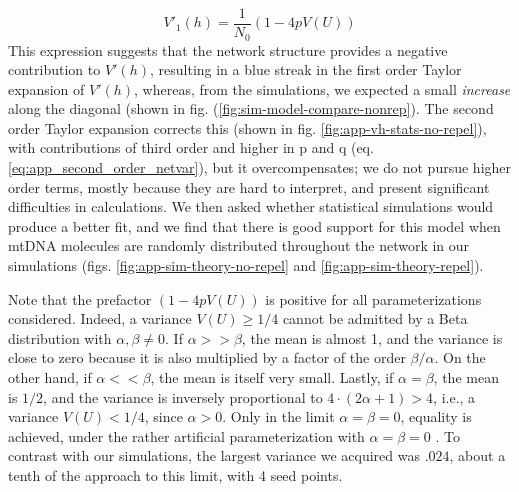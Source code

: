 \documentclass{article}
\begin{document}
\begin{appendices}
\begin{equation}\label{eq:vh-no-repel-delta}
    V'_1(h) = \frac{1}{N_0}(1-4pV(U))
\end{equation}
This expression suggests that the network structure provides a negative contribution to $V'(h)$, resulting in a blue streak in the first order Taylor expansion of $V'(h)$, whereas, from the simulations, we expected a small \textit{increase} along the diagonal (shown in fig. (\ref{fig:sim-model-compare-nonrep}). The second order Taylor expansion corrects this (shown in fig. \ref{fig:app-vh-stats-no-repel}), with contributions of third order and higher in p and q (eq. \ref{eq:app_second_order_netvar}), but it overcompensates; we do not pursue higher order terms, mostly because they are hard to interpret, and present significant difficulties in calculations. We then asked whether statistical simulations would produce a better fit, and we find that there is good support for this model when mtDNA molecules are randomly distributed throughout the network in our simulations (figs. \ref{fig:app-sim-theory-no-repel} and \ref{fig:app-sim-theory-repel}).

Note that the prefactor $(1-4pV(U))$ is positive for all parameterizations considered. Indeed, a variance $V(U)\geq1/4$ cannot be admitted by a Beta distribution with $\alpha,\beta\neq 0$. If $\alpha>>\beta$, the mean is almost 1, and the variance is close to zero because it is also multiplied by a factor of the order $\beta/\alpha$. On the other hand, if $\alpha<<\beta$, the mean is itself very small. Lastly, if $\alpha=\beta$, the mean is $1/2$, and the variance is inversely proportional to $4\cdot(2\alpha+1)>4$, i.e., a variance $V(U)<1/4$, since $\alpha>0$. Only in the limit $\alpha=\beta=0$, equality is achieved, under the rather artificial parameterization with $\alpha =\beta = 0$ \citep{johnson1995continuous}. To contrast with our simulations, the largest variance we acquired was $.024$, about a tenth of the approach to this limit, with 4 seed points.



\end{appendices}
\end{document}
